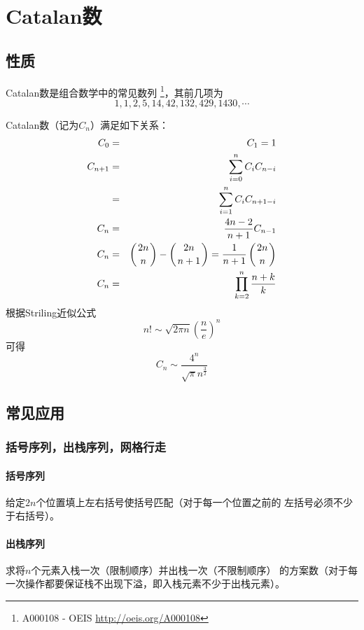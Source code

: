 \section{Catalan数}
\subsection{性质}
Catalan数是组合数学中的常见数列
\footnote{A000108 - OEIS \url{http://oeis.org/A000108}}，其前几项为
\begin{displaymath}
	1, 1, 2, 5, 14, 42, 132, 429, 1430, \cdots
\end{displaymath}

Catalan数（记为$C_n$）满足如下关系：
\begin{eqnarray}
	C_0&=&C_1=1\\
	C_{n+1}&=&\sum_{i=0}^n{C_iC_{n-i}}\label{CT2}\\
	&=&\sum_{i=1}^n{C_iC_{n+1-i}}\label{CT3}\\
	C_n&=&\frac{4n-2}{n+1}C_{n-1}\\
	C_n&=&\left(2n \atop n\right)-\left(2n \atop n+1\right)=\frac{1}{n+1}\left(2n \atop n\right)\\
	C_n&=&\prod_{k=2}^n\frac{n+k}{k}
\end{eqnarray}
根据Striling近似公式
\begin{displaymath}
	n!\sim\sqrt{2\pi n}\left(\frac{n}{e}\right)^n
\end{displaymath}
可得
\begin{displaymath}
	C_n\sim\frac{4^n}{\sqrt{\pi} n^\frac{3}{2}}
\end{displaymath}
\subsection{常见应用}
\subsubsection{括号序列，出栈序列，网格行走}
\paragraph{括号序列} 给定$2n$个位置填上左右括号使括号匹配（对于每一个位置之前的
左括号必须不少于右括号）。
\paragraph{出栈序列} 求将$n$个元素入栈一次（限制顺序）并出栈一次（不限制顺序）
的方案数（对于每一次操作都要保证栈不出现下溢，即入栈元素不少于出栈元素）。
